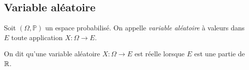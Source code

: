 \documentclass{magnolia}
\begin{document}





\subsection{Variable aléatoire}

\begin{definition}
Soit $(\Omega,\mathbb{P})$ un espace probabilisé. On appelle \emph{variable aléatoire}
à valeurs dans $E$ toute application $X:\Omega\to E$.
\end{definition}

\begin{remarqueUnique}
\remarque On dit qu'une variable aléatoire $X:\Omega\to E$ est réelle lorsque $E$ est une
  partie de $\mathbb{R}$.
\end{remarqueUnique}
\end{document}
